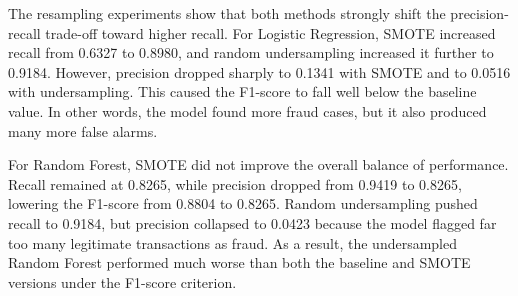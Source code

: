 \documentclass[11pt]{article}
\begin{document}
\begin{table}[ht]
    \centering
    \caption{Question 2 baseline, SMOTE, and random undersampling comparison on the held-out test set.}
    \label{tab:q2-resampling-comparison}
\end{table}

The resampling experiments show that both methods strongly shift the precision-recall trade-off toward higher recall. For Logistic Regression, SMOTE increased recall from 0.6327 to 0.8980, and random undersampling increased it further to 0.9184. However, precision dropped sharply to 0.1341 with SMOTE and to 0.0516 with undersampling. This caused the F1-score to fall well below the baseline value. In other words, the model found more fraud cases, but it also produced many more false alarms.

For Random Forest, SMOTE did not improve the overall balance of performance. Recall remained at 0.8265, while precision dropped from 0.9419 to 0.8265, lowering the F1-score from 0.8804 to 0.8265. Random undersampling pushed recall to 0.9184, but precision collapsed to 0.0423 because the model flagged far too many legitimate transactions as fraud. As a result, the undersampled Random Forest performed much worse than both the baseline and SMOTE versions under the F1-score criterion.
\end{document}
